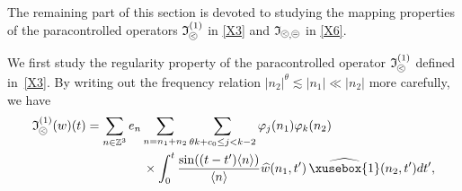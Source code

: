 \documentclass[%
11pt,  reqno]{amsart}
\def\<#1>{\xusebox{#1}}
\newcommand{\pe}{\mathbin{\scaleobj{0.7}{\tikz \draw (0,0) node[shape=circle,draw,inner sep=0pt,minimum size=8.5pt] {\scriptsize  $=$};}}}
\newcommand{\pl}{\mathbin{\scaleobj{0.7}{\tikz \draw (0,0) node[shape=circle,draw,inner sep=0pt,minimum size=8.5pt] {\scriptsize $<$};}}}
\newcommand{\1}{\hspace{0.2mm}\text{I}\hspace{0.2mm}}
\newcommand{\noi}{\noindent}
\newcommand{\Z}{\mathbb{Z}}
\newcommand{\T}{\mathbb{T}}
\newcommand{\E}{\mathbb{E}}
\newcommand{\F}{\mathcal{F}}
\newcommand{\eps}{\varepsilon}
\newcommand{\ft}{\widehat}
\newcommand{\ta}{\theta}
\newcommand{\les}{\lesssim}
\newcommand{\jb}[1]
{\langle #1 \rangle}
\renewcommand{\H}{\mathcal{H}}
\newcommand{\If}{\mathfrak{I}}
\numberwithin{equation}{section}
\numberwithin{theorem}{section}
\begin{document}
%
%
%
%
%
%
%
%




The remaining part of this section is devoted 
to studying the mapping properties
of 
the paracontrolled operators
$ \If_{\pl}^{(1)}$ in \eqref{X3}
and $\If_{\pl, \pe}$ in \eqref{X6}.


We first study the regularity property of the paracontrolled operator
$\If_{\pl}^{(1)}$ defined in~\eqref{X3}.
By writing out the frequency relation  $|n_2|^\theta \les |n_1| \ll |n_2|$
more carefully, we have
\begin{align}
\begin{split}
 \If_{\pl}^{(1)} (w) (t)
 &   =  \sum_{n \in \Z^3}
e_n  \sum_{n =  n_1 +  n_2}
\sum_{ \ta k + c_0 \leq j < k-2}
\varphi_j(n_1) \varphi_k(n_2)  \\
& \hphantom{XXXXX}
\times 
\int_0^t \frac{\sin ((t - t') \jb{n})}{\jb{n}} 
\ft w(n_1, t')\,  \ft{ \<1>}(n_2, t') dt', 
\end{split}
\label{XX2a}
\end{align}
\end{document}
